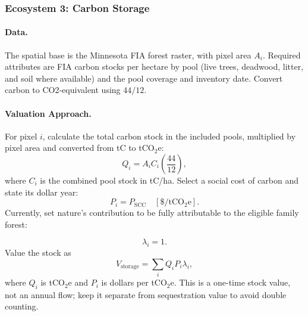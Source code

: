 \documentclass[11pt]{article}
\begin{document}



\subsubsection{Ecosystem 3: Carbon Storage}


\paragraph{Data.}
The spatial base is the Minnesota FIA forest raster, with pixel area $A_i$. Required attributes are FIA carbon stocks per hectare by pool (live trees, deadwood, litter, and soil where available) and the pool coverage and inventory date. Convert carbon to CO2-equivalent using $44/12$.

\paragraph{Valuation Approach.}
For pixel $i$, calculate the total carbon stock in the included pools, multiplied by pixel area and converted from tC to tCO$_2$e:
\[
Q_i=A_i C_i\left(\frac{44}{12}\right),
\]
where $C_i$ is the combined pool stock in tC/ha. Select a social cost of carbon and state its dollar year:
\[
P_i=P_{\mathrm{SCC}}\quad [\$/\mathrm{tCO_2e}].
\]
Currently, set nature's contribution to be fully attributable to the eligible family forest:

\[
\lambda_i= 1.
\]
Value the stock as
\[
V_{\mathrm{storage}}=\sum_i Q_iP_i\lambda_i,
\]
where $Q_i$ is tCO$_2$e and $P_i$ is dollars per tCO$_2$e. This is a one-time stock value, not an annual flow; keep it separate from sequestration value to avoid double counting.
\end{document}
